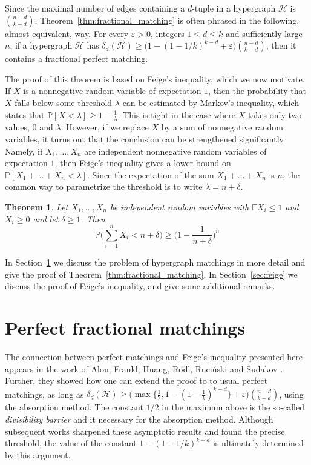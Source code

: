 \documentclass[10pt]{article}
\newtheorem{theorem}{Theorem}
\newcommand{\bE}{\mathbb{E}}
\newcommand{\cH}{\mathcal{H}}
\newcommand{\Pb}{\mathbb P}
\begin{document}
Since the maximal number of edges containing a $d$-tuple in a hypergraph $\cH$ is $\binom{n-d}{k-d}$, Theorem~\ref{thm:fractional_matching} is often phrased in the following, almost equivalent, way. For every $\varepsilon>0$, integers $1\leq d\leq k$ and sufficiently large $n$, if a hypergraph $\cH$ has $\delta_d(\cH)\geq \big(1-(1-1/k)^{k-d}+\varepsilon)\binom{n-d}{k-d}$, then it contains a fractional perfect matching.


The proof of this theorem is based on Feige's inequality, which we now motivate. If $X$ is a nonnegative random variable of expectation $1$, then the probability that $X$ falls below some threshold $\lambda$ can be estimated by Markov's inequality, which states that $\Pb[X< \lambda]\geq 1-\frac{1}{\lambda}$. This is tight in the case where $X$ takes only two values, $0$ and $\lambda$. However, if we replace $X$ by a sum of nonnegative random variables, it turns out that the conclusion can be strengthened significantly. Namely, if $X_1, \dots, X_n$ are independent nonnegative random variables of expectation $1$, then Feige's inequality gives a lower bound on $\Pb[X_1+\dots+X_n<\lambda]$. Since the expectation of the sum $X_1+\dots+X_n$ is $n$, the common way to parametrize the threshold is to write $\lambda=n+\delta$. 

\begin{theorem}\label{thm:feige}
Let $X_1,\ldots,X_n$ be independent random variables with $\bE X_i\leq 1$ and $X_i\geq 0$ and let $\delta\geq 1$. Then
\vspace{-0.2cm}
\[
 \Pb\Big(\sum_{i=1}^n X_i<n+\delta\Big) \geq \Big(1-\frac{1}{n+\delta}\Big)^n
\]
\end{theorem}

In Section~\ref{sec:matchings} we discuss the problem of hypergraph matchings in more detail and give the proof of Theorem~\ref{thm:fractional_matching}. In Section~\ref{sec:feige} we discuss the proof of Feige's inequality, and give some additional remarks.

\section{Perfect fractional matchings}\label{sec:matchings}

The connection between perfect matchings and Feige's inequality presented here appears in the work of Alon, Frankl, Huang, R\"odl, Ruci\'nski and Sudakov \cite{AFHRRS12}. Further, they showed how one can extend the proof to to usual perfect matchings, as long as $\delta_d(\cH)\geq \big(\max\{\frac{1}{2}, 1-(1-\frac{1}{k})^{k-d}\}+\varepsilon\big)\binom{n-d}{k-d}$, using the absorption method. The constant $1/2$ in the maximum above is the so-called \textit{divisibility barrier} and it necessary for the absorption method. Although subsequent works \cite{CLZ26,HLWY26,TZ13} sharpened these asymptotic results and found the precise threshold, the value of the constant $1-(1-1/k)^{k-d}$ is ultimately determined by this argument.
\end{document}
